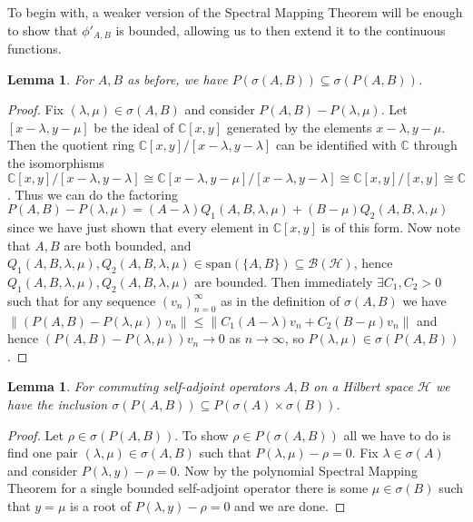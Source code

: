 \documentclass[12pt,oneside]{report}
\newtheorem{lem}[thm]{Lemma}
\begin{document}
To begin with, a weaker version of the Spectral Mapping Theorem will be enough to show that $\phi'_{A,B}$ is bounded, allowing us to then extend it to the continuous functions.

\begin{lem}\label{psigma-sigmap}
    For $A,B$ as before, we have $P(\sigma(A,B)) \subseteq \sigma(P(A,B))$.
\end{lem}
\begin{proof}
    Fix $(\lambda,\mu) \in \sigma(A,B)$ and consider $P(A,B) - P(\lambda, \mu)$. Let $[x - \lambda, y - \mu]$ be the ideal of $\mathbb{C}[x, y]$ generated by the elements $x - \lambda, y - \mu$. Then the quotient ring $\mathbb{C}[x,y]/[x - \lambda, y - \lambda]$ can be identified with $\mathbb{C}$ through the isomorphisms $\mathbb{C}[x,y]/[x - \lambda, y - \lambda] \cong \mathbb{C}[x - \lambda, y - \mu]/[x - \lambda, y - \lambda] \cong \mathbb{C}[x,y]/[x, y] \cong \mathbb{C}$. Thus we can do the factoring $P(A,B) - P(\lambda, \mu) = (A - \lambda)Q_{1}(A,B,\lambda,\mu) + (B - \mu)Q_{2}(A,B,\lambda,\mu)$ since we have just shown that every element in $\mathbb{C}[x,y]$ is of this form. Now note that $A,B$ are both bounded, and $Q_{1}(A,B,\lambda,\mu), Q_{2}(A,B,\lambda,\mu) \in \text{span}(\{ A,B \}) \subseteq \mathscr{B}(\mathscr{H})$, hence $Q_{1}(A,B,\lambda,\mu),Q_{2}(A,B,\lambda,\mu)$ are bounded. Then immediately $\exists C_{1},C_{2} > 0$ such that for any sequence $(v_{n})_{n=0}^{\infty}$ as in the definition of $\sigma(A,B)$ we have $\|(P(A,B) - P(\lambda,\mu))v_{n}\| \leq \|C_{1}(A-\lambda)v_{n} + C_{2}(B-\mu)v_{n}\|$ and hence $(P(A,B) - P(\lambda,\mu))v_{n} \to 0$ as $n \to \infty$, so $P(\lambda,\mu) \in \sigma(P(A,B))$.
\end{proof}

\begin{lem}\label{sigmap-psigma}
    For commuting self-adjoint operators $A,B$ on a Hilbert space $\mathscr{H}$ we have the inclusion $\sigma(P(A,B)) \subseteq P(\sigma(A) \times \sigma(B))$.
\end{lem}
\begin{proof}
    Let $\rho \in \sigma(P(A,B))$. To show $\rho \in P(\sigma(A,B))$ all we have to do is find one pair $(\lambda,\mu) \in \sigma(A,B)$ such that $P(\lambda,\mu) - \rho = 0$. Fix $\lambda \in \sigma(A)$ and consider $P(\lambda,y) - \rho = 0$. Now by the polynomial Spectral Mapping Theorem for a single bounded self-adjoint operator there is some $\mu \in \sigma(B)$ such that $y = \mu$ is a root of $P(\lambda,y) - \rho = 0$ and we are done.
\end{proof}
\end{document}
